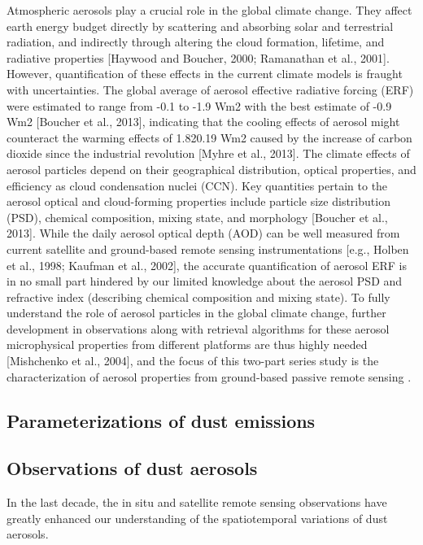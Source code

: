 Atmospheric aerosols play a crucial role in the global 
climate change. They affect earth energy budget directly 
by scattering and absorbing solar and terrestrial radiation, 
and indirectly through altering the cloud formation, 
lifetime, and radiative properties [Haywood and Boucher, 
2000; Ramanathan et al., 2001]. However, quantification of 
these effects in the current climate models is fraught with 
uncertainties. The global average of aerosol effective 
radiative forcing (ERF) were estimated to range from -0.1 
to -1.9 Wm2 with the best estimate of -0.9 Wm2 [Boucher et 
al., 2013], indicating that the cooling effects of aerosol 
might counteract the warming effects of 1.820.19 Wm2 caused
by the increase of carbon dioxide since the industrial 
revolution [Myhre et al., 2013]. The climate effects of 
aerosol particles depend on their geographical distribution, 
optical properties, and efficiency as cloud condensation 
nuclei (CCN). Key quantities pertain to the aerosol optical 
and cloud-forming properties include particle size 
distribution (PSD), chemical composition, mixing state, and 
morphology [Boucher et al., 2013]. While the daily aerosol 
optical depth (AOD) can be well measured from current 
satellite and ground-based remote sensing instrumentations 
[e.g., Holben et al., 1998; Kaufman et al., 2002], the 
accurate quantification of aerosol ERF is in no small part 
hindered by our limited knowledge about the aerosol PSD and 
refractive index (describing chemical composition and 
mixing state). To fully understand the role of aerosol 
particles in the global climate change, further development 
in observations along with retrieval algorithms for these 
aerosol microphysical properties from different platforms 
are thus highly needed [Mishchenko et al., 2004], and 
the focus of this two-part series study is the 
characterization of aerosol properties from ground-based 
passive remote sensing \citep{henze07}. 

\subsection{Parameterizations of dust emissions}

\subsection{Observations of dust aerosols}

 In the last decade, the in situ and satellite remote sensing observations 
 have greatly enhanced our understanding of the spatiotemporal variations
 of dust aerosols. 


